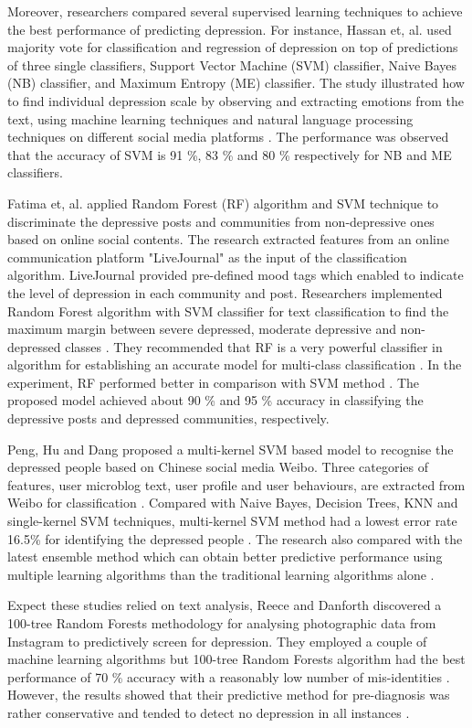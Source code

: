 \documentclass[10pt,journal,compsoc]{IEEEtran}
\begin{document}
Moreover, researchers compared several supervised learning techniques to achieve the best performance of predicting depression. For instance, Hassan et, al. \cite{Hassan} used majority vote for classification and regression of depression on top of predictions of three single classifiers, Support Vector Machine (SVM) classifier, Naive Bayes (NB) classifier, and Maximum Entropy (ME) classifier. The study illustrated how to find individual depression scale by observing and extracting emotions from the text, using machine learning techniques and natural language processing techniques on different social media platforms \cite{Hassan}. The performance was observed that the accuracy of SVM is 91 \%,  83 \% and 80 \% respectively for NB and ME classifiers.

Fatima et, al. \cite{Fatima} applied Random Forest (RF) algorithm and SVM technique to discriminate the depressive posts and communities from non-depressive ones based on online social contents. The research extracted features from an online communication platform "LiveJournal" as the input of the classification algorithm. LiveJournal provided pre-defined mood tags which enabled to indicate the level of depression in each community and post. Researchers implemented Random Forest algorithm with SVM classifier for text classification to find the maximum margin between severe depressed, moderate depressive and non-depressed classes \cite{Fatima}. They recommended that RF is a very powerful classifier in algorithm for establishing an accurate model for multi-class classification \cite{Fatima}. In the experiment, RF performed better in comparison with SVM method \cite{Fatima}. The proposed model achieved about 90 \% and 95 \% accuracy in classifying the depressive posts and depressed communities, respectively.

Peng, Hu and Dang \cite{Peng} proposed a multi-kernel SVM based model to recognise the depressed people based on Chinese social media Weibo. Three categories of features, user microblog text, user profile and user behaviours, are extracted from Weibo for classification \cite{Peng}. Compared with Naive Bayes, Decision Trees, KNN and single-kernel SVM techniques, multi-kernel SVM method had a lowest error rate 16.5\% for identifying the depressed people \cite{Peng}. The research also compared with the latest ensemble method which can obtain better predictive performance using multiple learning algorithms than the traditional learning algorithms alone \cite{Peng}.

Expect these studies relied on text analysis, Reece and Danforth discovered a 100-tree Random Forests methodology for analysing photographic data from Instagram to predictively screen for depression. They employed a couple of machine learning algorithms but 100-tree Random Forests algorithm had the best performance of 70 \% accuracy with a reasonably low number of mis-identities \cite{Reece}. However, the results showed that their predictive method for pre-diagnosis was rather conservative and tended to detect no depression in all instances \cite{Reece}. 
\end{document}
